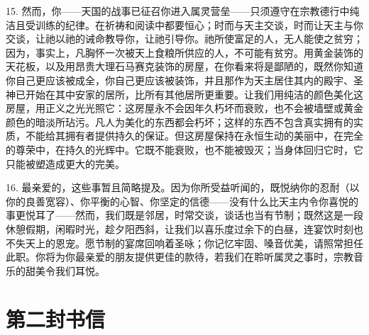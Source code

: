 15. 然而，你——天国的战事已征召你进入属灵营垒——只须遵守在宗教德行中纯洁且受训练的纪律。在祈祷和阅读中都要恒心；时而与天主交谈，时而让天主与你交谈，让祂以祂的诫命教导你，让祂引导你。祂所使富足的人，无人能使之贫穷；因为，事实上，凡胸怀一次被天上食粮所供应的人，不可能有贫穷。用黄金装饰的天花板，以及用昂贵大理石马赛克装饰的房屋，在你看来将是鄙陋的，既然你知道你自己更应该被成全，你自己更应该被装饰，并且那作为天主居住其内的殿宇、圣神已开始在其中安家的居所，比所有其他居所更重要。让我们用纯洁的颜色美化这房屋，用正义之光光照它：这房屋永不会因年久朽坏而衰败，也不会被墙壁或黄金颜色的暗淡所玷污。凡人为美化的东西都会朽坏；这样的东西不包含真实拥有的实质，不能给其拥有者提供持久的保证。但这房屋保持在永恒生动的美丽中，在完全的尊荣中，在持久的光辉中。它既不能衰败，也不能被毁灭；当身体回归它时，它只能被塑造成更大的完美。\par

16. 最亲爱的，这些事暂且简略提及。因为你所受益听闻的，既悦纳你的忍耐（以你的良善宽容）、你平衡的心智、你坚定的信德——没有什么比天主内令你喜悦的事更悦耳了——然而，我们既是邻居，时常交谈，谈话也当有节制；既然这是一段休憩假期，闲暇时光，趁夕阳西斜，让我们以喜乐度过余下的白昼，连宴饮时刻也不失天上的恩宠。愿节制的宴席回响着圣咏；你记忆牢固、嗓音优美，请照常担任此职。你将为你最亲爱的朋友提供更佳的款待，若我们在聆听属灵之事时，宗教音乐的甜美令我们耳悦。\par



\section{第二封书信}

\par

\par

